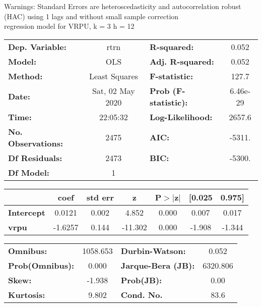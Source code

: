 Warnings: \newline
 [1] Standard Errors are heteroscedasticity and autocorrelation robust (HAC) using 1 lags and without small sample correction\\ 

regression model for VRPU, k = 3 h = 12\begin{center}
\begin{tabular}{lclc}
\toprule
\textbf{Dep. Variable:}    &       rtrn       & \textbf{  R-squared:         } &     0.052   \\
\textbf{Model:}            &       OLS        & \textbf{  Adj. R-squared:    } &     0.052   \\
\textbf{Method:}           &  Least Squares   & \textbf{  F-statistic:       } &     127.7   \\
\textbf{Date:}             & Sat, 02 May 2020 & \textbf{  Prob (F-statistic):} &  6.46e-29   \\
\textbf{Time:}             &     22:05:32     & \textbf{  Log-Likelihood:    } &    2657.6   \\
\textbf{No. Observations:} &        2475      & \textbf{  AIC:               } &    -5311.   \\
\textbf{Df Residuals:}     &        2473      & \textbf{  BIC:               } &    -5300.   \\
\textbf{Df Model:}         &           1      & \textbf{                     } &             \\
\bottomrule
\end{tabular}
\begin{tabular}{lcccccc}
                   & \textbf{coef} & \textbf{std err} & \textbf{z} & \textbf{P$> |$z$|$} & \textbf{[0.025} & \textbf{0.975]}  \\
\midrule
\textbf{Intercept} &       0.0121  &        0.002     &     4.852  &         0.000        &        0.007    &        0.017     \\
\textbf{vrpu}      &      -1.6257  &        0.144     &   -11.302  &         0.000        &       -1.908    &       -1.344     \\
\bottomrule
\end{tabular}
\begin{tabular}{lclc}
\textbf{Omnibus:}       & 1058.653 & \textbf{  Durbin-Watson:     } &    0.052  \\
\textbf{Prob(Omnibus):} &   0.000  & \textbf{  Jarque-Bera (JB):  } & 6320.806  \\
\textbf{Skew:}          &  -1.938  & \textbf{  Prob(JB):          } &     0.00  \\
\textbf{Kurtosis:}      &   9.802  & \textbf{  Cond. No.          } &     83.6  \\
\bottomrule
\end{tabular}
\end{center}

